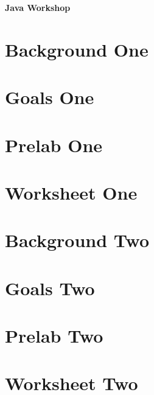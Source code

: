 \documentclass{article}
\renewcommand{\maketitle}{
   \begin{center}
      {\Huge \bfseries Java Workshop}
   \end{center}
}
\begin{document}
\maketitle

\section{Background One}

\pagebreak

\section{Goals One}

\pagebreak

\section{Prelab One}

\pagebreak

\section{Worksheet One}

\pagebreak

\section{Background Two}
\pagebreak

\section{Goals Two}
\pagebreak

\section{Prelab Two}
\pagebreak

\section{Worksheet Two}
\pagebreak
\end{document}
